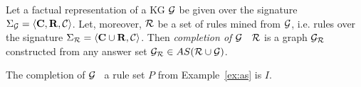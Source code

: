 \begin{definition}\label{def:graphcompl}
Let a factual representation of a KG $\mathcal{G}$ be given over the signature $\Sigma_{\mathcal{G}}=\langle\mathbf{C},\mathbf{R},\mathcal{C}\rangle$. Let, moreover, $\mathcal{R}$ be a set of rules mined from $\mathcal{G}$, i.e. rules over the signature $\Sigma_{\mathcal{R}}=\langle\mathbf{C}\cup \mathbf{R},\mathcal{C}\rangle$. Then \emph{completion of $\mathcal{G}$ \wrt\ $\mathcal{R}$} is a graph $\mathcal{G}_{\mathcal{R}}$ constructed from any answer set $\mathcal{G}_{\mathcal{R}}\in AS(\mathcal{R} \cup \mathcal{G})$.
\end{definition}
\begin{example}
The completion of $\mathcal{G}$ \wrt\ a rule set $P$ from Example~\ref{ex:as} is $I$.
\end{example}


